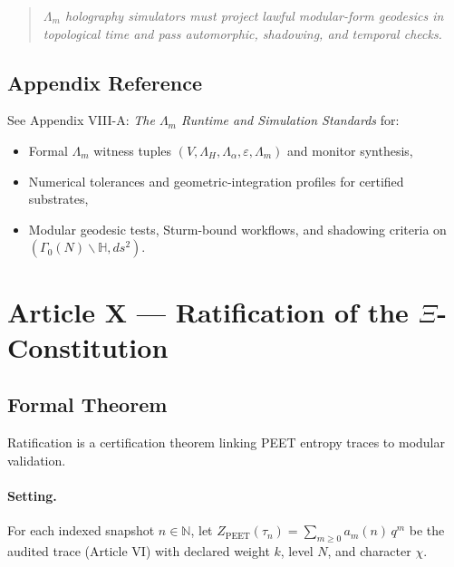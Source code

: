\documentclass[12pt]{amsart}
\theoremstyle{plain}
\begin{document}
\begin{quote}
\textit{$\Lambda_m$ holography simulators must project lawful modular-form geodesics in topological time and pass automorphic, shadowing, and temporal checks.}
\end{quote}

\subsection*{Appendix Reference}

See Appendix VIII-A: \emph{The $\Lambda_m$ Runtime and Simulation Standards} for:
\begin{itemize}
  \item Formal $\Lambda_m$ witness tuples $(V,\Lambda_H,\Lambda_\alpha,\varepsilon,\Lambda_m)$ and monitor synthesis,
  \item Numerical tolerances and geometric-integration profiles for certified substrates,
  \item Modular geodesic tests, Sturm-bound workflows, and shadowing criteria on $(\Gamma_0(N)\backslash\mathbb{H},ds^2)$.
\end{itemize}
\section{Article X — Ratification of the $\Xi$-Constitution}

\subsection{Formal Theorem}

Ratification is a certification theorem linking PEET entropy traces to modular validation.

\paragraph{Setting.}
For each indexed snapshot $n\in\mathbb{N}$, let $Z_{\mathrm{PEET}}(\tau_n)=\sum_{m\ge0}a_m(n)\,q^m$ be the audited trace (Article VI) with declared weight $k$, level $N$, and character $\chi$.
\end{document}
